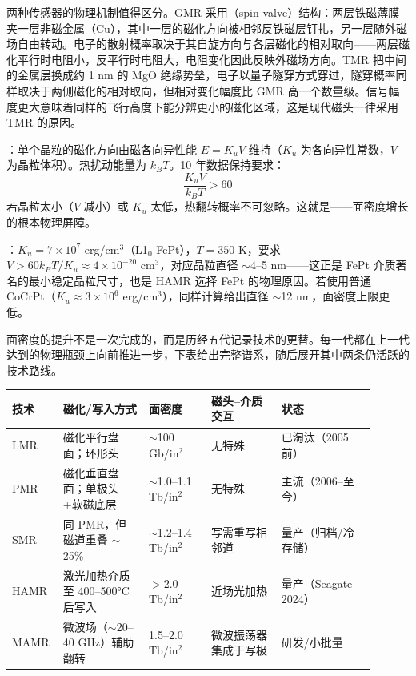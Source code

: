 两种传感器的物理机制值得区分。GMR 采用（spin valve）结构：两层铁磁薄膜夹一层非磁金属（Cu），其中一层的磁化方向被相邻反铁磁层钉扎，另一层随外磁场自由转动。电子的散射概率取决于其自旋方向与各层磁化的相对取向——两层磁化平行时电阻小，反平行时电阻大，电阻变化因此反映外磁场方向。TMR 把中间的金属层换成约 1 nm 的 MgO 绝缘势垒，电子以量子隧穿方式穿过，隧穿概率同样取决于两侧磁化的相对取向，但相对变化幅度比 GMR 高一个数量级。信号幅度更大意味着同样的飞行高度下能分辨更小的磁化区域，这是现代磁头一律采用 TMR 的原因。

：单个晶粒的磁化方向由磁各向异性能 $E = K_u V$ 维持（$K_u$ 为各向异性常数，$V$ 为晶粒体积）。热扰动能量为 $k_B T$。10 年数据保持要求：
\[
\frac{K_u V}{k_B T} > 60
\]
若晶粒太小（$V$ 减小）或 $K_u$ 太低，热翻转概率不可忽略。这就是——面密度增长的根本物理屏障。

：$K_u = 7 \times 10^7$ erg/cm$^3$（L1$_0$-FePt），$T = 350$ K，要求 $V > 60 k_B T / K_u \approx 4 \times 10^{-20}$ cm$^3$，对应晶粒直径 $\sim$4--5 nm——这正是 FePt 介质著名的最小稳定晶粒尺寸，也是 HAMR 选择 FePt 的物理原因。若使用普通 CoCrPt（$K_u \approx 3 \times 10^6$ erg/cm$^3$），同样计算给出直径 $\sim$12 nm，面密度上限更低。


面密度的提升不是一次完成的，而是历经五代记录技术的更替。每一代都在上一代达到的物理瓶颈上向前推进一步，下表给出完整谱系，随后展开其中两条仍活跃的技术路线。

\begin{longtable}{L{0.10\linewidth}L{0.22\linewidth}L{0.16\linewidth}L{0.18\linewidth}L{0.24\linewidth}}
\toprule
技术 & 磁化/写入方式 & 面密度 & 磁头--介质交互 & 状态 \\
\midrule
LMR & 磁化平行盘面；环形头 & $\sim$100 Gb/in$^2$ & 无特殊 & 已淘汰（2005 前） \\\tablerowrule
PMR & 磁化垂直盘面；单极头+软磁底层 & $\sim$1.0--1.1 Tb/in$^2$ & 无特殊 & 主流（2006--至今） \\\tablerowrule
SMR & 同 PMR，但磁道重叠 $\sim$25\% & $\sim$1.2--1.4 Tb/in$^2$ & 写需重写相邻道 & 量产（归档/冷存储） \\\tablerowrule
HAMR & 激光加热介质至 400--500°C 后写入 & $>$2.0 Tb/in$^2$ & 近场光加热 & 量产（Seagate 2024） \\\tablerowrule
MAMR & 微波场（$\sim$20--40 GHz）辅助翻转 & 1.5--2.0 Tb/in$^2$ & 微波振荡器集成于写极 & 研发/小批量 \\
\bottomrule
\end{longtable}

